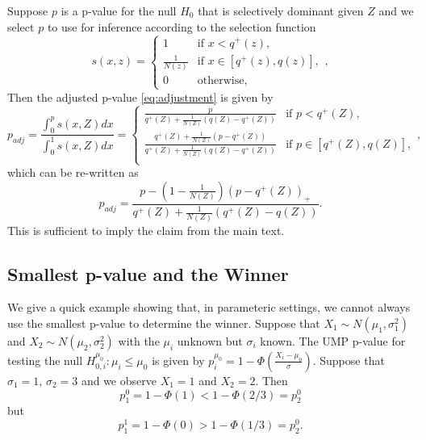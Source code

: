 \documentclass{article}
\begin{document}
\begin{appendix}
Suppose $p$ is a p-value for the null $H_0$ that is selectively dominant given $Z$ and we select $p$ to use for inference according to the selection function 
    \begin{equation*}
        s(x, z) = 
        \begin{cases} 
        1 & \text{if } x < q^+(z), \\
        \frac{1}{N(z)} & \text{if } x \in [q^+(z), q(z)], \\
        0 & \text{otherwise},
        \end{cases},
    \end{equation*}
Then the adjusted p-value \eqref{eq:adjustment} is given by 
\begin{equation*}
    p_{adj} = \frac{\int_0^p s(x, Z) dx }{\int_0^1 s(x, Z)dx} = 
        \begin{cases} 
        \frac{p}{q^{+}(Z) + \frac{1}{N(Z)}(q(Z) - q^{+}(Z)) }  & \text{if } p  < q^+(Z), \\
        \frac{q^{+}(Z)+ \frac{1}{N(Z)}(p - q^{+}(Z))}{q^{+}(Z) + \frac{1}{N(Z)}(q(Z) - q^{+}(Z)) } & \text{if } p \in [q^+(Z), q(Z)], \\
        \end{cases},
\end{equation*}
which can be re-written as 
\begin{equation*}
   p_{adj} = \frac{p - (1-\frac{1}{N(Z)})(p - q^+(Z))_+ }{q^+(Z) + \frac{1}{N(Z)}(q^+(Z) - q(Z))}.
\end{equation*}
This is sufficient to imply the claim from the main text. 

\subsection{Smallest p-value and the Winner}
\label{sec:small_p_val_appdx}

We give a quick example showing that, in parameteric settings, we cannot always use the smallest p-value to determine the winner. Suppose that $X_1 \sim N(\mu_1, \sigma_1^2)$ and $X_2 \sim N(\mu_2, \sigma_2^2)$ with the $\mu_i$ unknown but $\sigma_i$ known. The UMP p-value for testing the null $H_{0, i}^{\mu_0}: \mu_i \leq \mu_0$ is given by $p^{\mu_0}_i = 1- \Phi(\frac{X_i - \mu_0}{\sigma})$. Suppose that $\sigma_1 = 1$, $\sigma_2 = 3$ and we observe $X_1 = 1$ and $X_2=2$. Then
\begin{equation*}
    p^0_1 = 1 - \Phi(1) < 1 - \Phi(2/3) = p^0_2
\end{equation*}
but 
\begin{equation*}
    p^1_1 = 1 - \Phi(0) > 1 - \Phi(1/3) = p^0_2.
\end{equation*}


\end{appendix}
\end{document}
